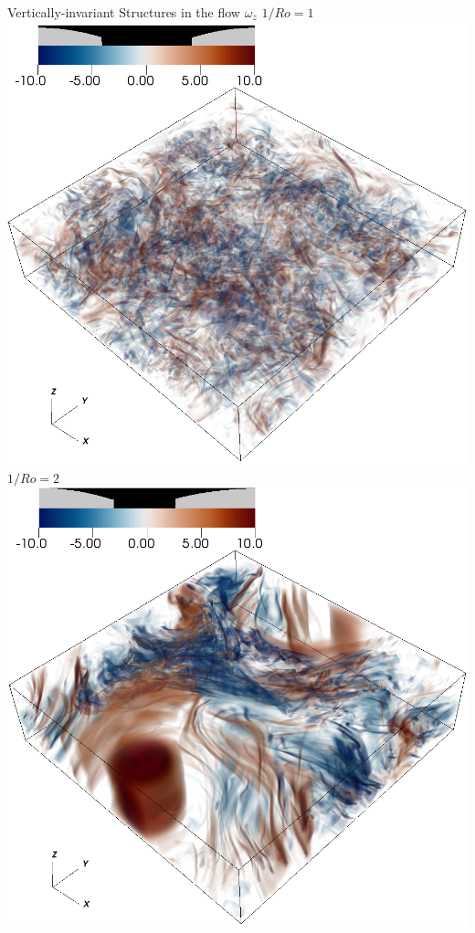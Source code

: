 \documentclass{beamer}
\begin{document}
\begin{frame}{Vertically-invariant Structures in the flow}
    \centering
        $\omega_z$
    \emp
        \centering
        $1/Ro = 1$
        \includegraphics[width=.95\textwidth]{images/vortz_Om0.5_vr2.png}
    \emp
        \centering
        $1/Ro = 2$
        \includegraphics[width=.95\textwidth]{images/vortz_Om2_vr2.png}

\end{frame}
\end{document}
